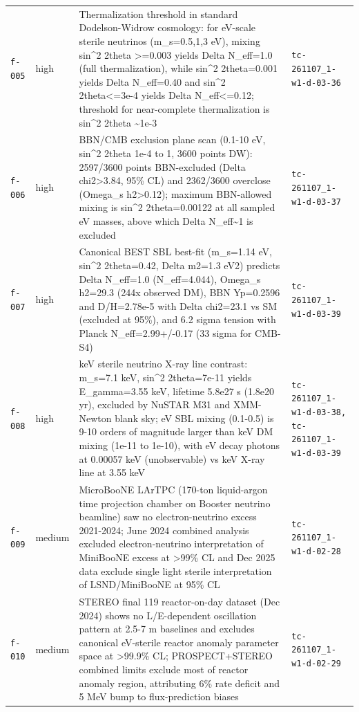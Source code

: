 \documentclass[11pt,a4paper]{article}
\begin{document}
\begin{longtable}{@{}p{}p{}p{}p{}@{}}
\texttt{f-005} & high & Thermalization threshold in standard Dodelson-Widrow cosmology: for eV-scale sterile neutrinos (m\_s=0.5,1,3 eV), mixing sin\textasciicircum{}2 2theta \textgreater{}=0.003 yields Delta N\_eff=1.0 (full thermalization), while sin\textasciicircum{}2 2theta=0.001 yields Delta N\_eff=0.40 and sin\textasciicircum{}2 2theta\textless{}=3e-4 yields Delta N\_eff\textless{}=0.12; threshold for near-complete thermalization is sin\textasciicircum{}2 2theta \textasciitilde{}1e-3 & \texttt{tc-261107\_\allowbreak{}1-w1-d-03-36} \\
\texttt{f-006} & high & BBN/CMB exclusion plane scan (0.1-10 eV, sin\textasciicircum{}2 2theta 1e-4 to 1, 3600 points DW): 2597/3600 points BBN-excluded (Delta chi2\textgreater{}3.84, 95\% CL) and 2362/3600 overclose (Omega\_s h2\textgreater{}0.12); maximum BBN-allowed mixing is sin\textasciicircum{}2 2theta=0.00122 at all sampled eV masses, above which Delta N\_eff\textasciitilde{}1 is excluded & \texttt{tc-261107\_\allowbreak{}1-w1-d-03-37} \\
\texttt{f-007} & high & Canonical BEST SBL best-fit (m\_s=1.14 eV, sin\textasciicircum{}2 2theta=0.42, Delta m2=1.3 eV2) predicts Delta N\_eff=1.0 (N\_eff=4.044), Omega\_s h2=29.3 (244x observed DM), BBN Yp=0.2596 and D/H=2.78e-5 with Delta chi2=23.1 vs SM (excluded at 95\%), and 6.2 sigma tension with Planck N\_eff=2.99+/-0.17 (33 sigma for CMB-S4) & \texttt{tc-261107\_\allowbreak{}1-w1-d-03-39} \\
\texttt{f-008} & high & keV sterile neutrino X-ray line contrast: m\_s=7.1 keV, sin\textasciicircum{}2 2theta=7e-11 yields E\_gamma=3.55 keV, lifetime 5.8e27 s (1.8e20 yr), excluded by NuSTAR M31 and XMM-Newton blank sky; eV SBL mixing (0.1-0.5) is 9-10 orders of magnitude larger than keV DM mixing (1e-11 to 1e-10), with eV decay photons at 0.00057 keV (unobservable) vs keV X-ray line at 3.55 keV & \texttt{tc-261107\_\allowbreak{}1-w1-d-03-38,\allowbreak{} tc-261107\_\allowbreak{}1-w1-d-03-39} \\
\texttt{f-009} & medium & MicroBooNE LArTPC (170-ton liquid-argon time projection chamber on Booster neutrino beamline) saw no electron-neutrino excess 2021-2024; June 2024 combined analysis excluded electron-neutrino interpretation of MiniBooNE excess at \textgreater{}99\% CL and Dec 2025 data exclude single light sterile interpretation of LSND/MiniBooNE at 95\% CL & \texttt{tc-261107\_\allowbreak{}1-w1-d-02-28} \\
\texttt{f-010} & medium & STEREO final 119 reactor-on-day dataset (Dec 2024) shows no L/E-dependent oscillation pattern at 2.5-7 m baselines and excludes canonical eV-sterile reactor anomaly parameter space at \textgreater{}99.9\% CL; PROSPECT+STEREO combined limits exclude most of reactor anomaly region, attributing 6\% rate deficit and 5 MeV bump to flux-prediction biases & \texttt{tc-261107\_\allowbreak{}1-w1-d-02-29} \\

\end{longtable}
\end{document}
